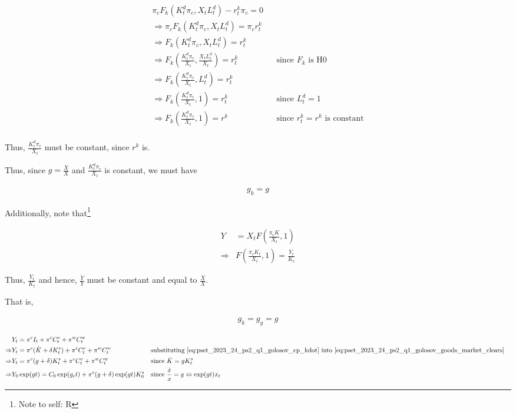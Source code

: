 \begin{align}
    \pi_c F_k(K_t^d\pi_c, X_t L_t^d) - r^k_t \pi_c = 0 \\
    \Rightarrow \pi_c F_k(K_t^d\pi_c, X_t L_t^d) = \pi_c r^k_t \\ 
    \Rightarrow F_k(K_t^d\pi_c, X_t L_t^d) = r^k_t \\
    \Rightarrow F_k(\frac{K_t^d\pi_c}{X_t},\frac{X_t L_t^d}{X_t}) = r^k_t && \text{since $F_k$ is H0} \\
    \Rightarrow F_k(\frac{K_t^d\pi_c}{X_t}, L_t^d) = r^k_t \\
    \Rightarrow F_k(\frac{K_t^d\pi_c}{X_t}, 1) = r^k_t && \text{since $L_t^d = 1$}  \\
    \Rightarrow F_k(\frac{K_t^d\pi_c}{X_t}, 1) = r^k && \text{since $r^k_t = r^k$ is constant} \\
\end{align}

Thus, $\frac{K_t^d\pi_c}{X_t}$ must be constant, since $r^k$ is.

Thus, since $g = \frac{\dot{X}}{X}$ and $\frac{K_t^d\pi_c}{X_t}$ is constant, we must have

\begin{align}
    g_{k} = g
\end{align}

Additionally, note that\footnote{Note to self: R}

\begin{align}
    Y &= X_t F(\frac{\pi_c K}{X_t}, 1) \\
    \Rightarrow &F(\frac{\pi_c K_t}{X_t}, 1) = \frac{Y_t}{K_t}
\end{align}

Thus, $\frac{Y_t}{K_t}$ and hence, $\frac{\dot{Y}}{Y}$ must be constant and 
equal to $\frac{\dot{X}}{X}$.

That is, 

\begin{align}
    g_k = g_y = g
\end{align}

\begin{align}
    &Y_t = \pi^c I_t+\pi^c C_t^c+\pi^w C_t^w \\
    \Rightarrow &Y_t = \pi^c (\dot{K} + \delta K_t^s) + \pi^c C_t^c+\pi^w C_t^w && \text{substituting \eqref{eq:pset_2023_24_ps2_q1_golosov_cp_kdot} into \eqref{eq:pset_2023_24_ps2_q1_golosov_goods_market_clears}} \\
    \Rightarrow &Y_t = \pi^c (g + \delta)K_t^s + \pi^c C_t^c+\pi^w C_t^w && \text{since $\dot{K} = gK^s_t$} \\
    \Rightarrow &Y_0 \exp(gt) = C_0 \exp(g_ct) + \pi^c (g + \delta)\exp(gt) K_0^s && \text{since $\frac{\dot{x}}{x} = g \Leftrightarrow \exp(gt)x_t$} \\
\end{align}

